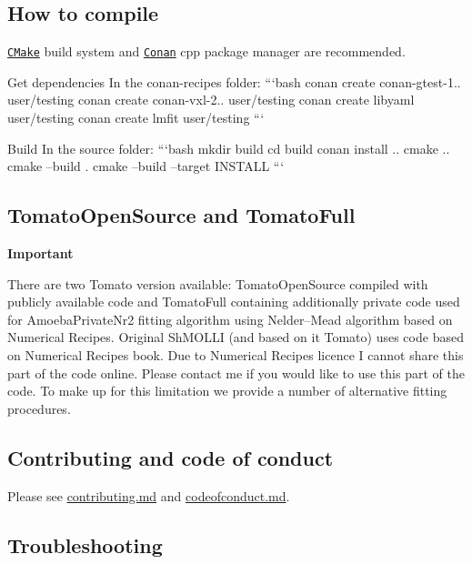 \subsection*{How to compile}

\href{cmake.org}{\tt C\+Make} build system and \href{conan.io}{\tt Conan} cpp package manager are recommended.


\begin{DoxyEnumerate}
\item Get dependencies In the conan-\/recipes folder\+: ```bash conan create conan-\/gtest-\/1.. user/testing conan create conan-\/vxl-\/2.. user/testing conan create libyaml user/testing conan create lmfit user/testing ```
\item Build In the source folder\+: ```bash mkdir build cd build conan install .. cmake .. cmake --build . cmake --build --target I\+N\+S\+T\+A\+LL ```
\end{DoxyEnumerate}

\subsection*{Tomato\+Open\+Source and Tomato\+Full}

{\bfseries Important}

There are two {\ttfamily Tomato} version available\+: {\ttfamily Tomato\+Open\+Source} compiled with publicly available code and {\ttfamily Tomato\+Full} containing additionally private code used for {\ttfamily Amoeba\+Private\+Nr2} fitting algorithm using Nelder–\+Mead algorithm based on Numerical Recipes. Original Sh\+M\+O\+L\+LI (and based on it Tomato) uses code based on Numerical Recipes book. Due to Numerical Recipes licence I cannot share this part of the code online. Please contact me if you would like to use this part of the code. To make up for this limitation we provide a number of alternative fitting procedures.

\subsection*{Contributing and code of conduct}

Please see \hyperlink{md_contributing}{contributing.md} and \hyperlink{md_codeofconduct}{codeofconduct.md}.

\subsection*{Troubleshooting}


